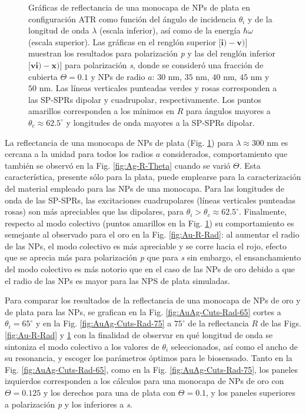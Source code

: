 \begin{figure}[h!]
\vspace*{-.5em}
	\caption{Gráficas de reflectancia de una monocapa de NPs de plata en configuración ATR como función del ángulo de incidencia $\theta_i$ y de la longitud de onda $\lambda$ (escala inferior), así como de la energía  $\hbar\omega$ (escala superior).  Las gráficas   en el renglón superior [$\mathbf{i)-v)}$] muestran los resultados para  polarización \emph{p} y las del renglón inferior  [$\mathbf{vi)-x)}$]  para polarización  \emph{s}, donde se consideró una fracción de cubierta $\Theta = 0.1$ y  NPs de radio  $a$: $30$ nm, $35$ nm, $40$ nm, $45$ nm y $50$ nm.  Las líneas verticales punteadas verdes y rosas corresponden a las SP-SPRs dipolar y  cuadrupolar, respectivamente.  Los puntos amarillos corresponden a los mínimos en $R$ para ángulos mayores a $\theta_c\approx 62.5^\circ$ y longitudes de onda mayores a la SP-SPRs dipolar.
}	\label{fig:Ag-R-Rad}	
	\end{figure}	

La reflectancia de una monocapa de NPs de plata (Fig. \ref{fig:Ag-R-Rad}) para $\lambda\approx 300$ nm es cercana a la unidad para todos los radios $a$ considerados, comportamiento que también se observó en la Fig. \ref{fig:Ag-R-Theta} cuando se varió $\Theta$. Esta característica, presente sólo para la plata, puede emplearse para la caracterización del material empleado para las NPs de una monocapa. Para las longitudes de onda de las SP-SPRs, las excitaciones cuadrupolares (líneas verticales punteadas rosas) son más apreciables que las dipolares, para $\theta_i>\theta_c\approx 62.5^\circ$. Finalmente, respecto al  modo colectivo (puntos amarillos en la Fig. \ref{fig:Ag-R-Rad}) su comportamiento es semejante al observado para el oro en la Fig. \ref{fig:Au-R-Rad}: al aumentar el radio de las NPs, el modo colectivo es más apreciable y se corre hacia el rojo, efecto que se aprecia más para polarización \emph{p} que para \emph{s} sin embargo, el ensanchamiento del modo colectivo es más notorio que en el caso de las NPs de oro debido a que el radio de las NPs es mayor para las NPS de plata simuladas.

Para comparar los resultados de la reflectancia de una monocapa de NPs de oro y de  plata para las NPs, se grafican en la Fig. \ref{fig:AuAg-Cuts-Rad-65} cortes a $\theta_i = 65^\circ$  y en la  Fig.  \ref{fig:AuAg-Cuts-Rad-75} a $75^\circ$ de la reflectancia $R$ de las Figs. \ref{fig:Au-R-Rad} y \ref{fig:Ag-R-Rad} con la finalidad de observar en qué longitud de onda se sintoniza el modo colectivo a los valores de $\theta_i$ seleccionados, así como el ancho de su resonancia, y escoger los parámetros óptimos para le biosensado. Tanto en la Fig. \ref{fig:AuAg-Cuts-Rad-65}, como en la Fig. \ref{fig:AuAg-Cuts-Rad-75}, los paneles izquierdos corresponden a los cálculos para una monocapa de NPs de oro con $\Theta=0.125$ y los derechos para una de plata con $\Theta=0.1$, y los paneles superiores a polarización \emph{p} y los inferiores a \emph{s}.

